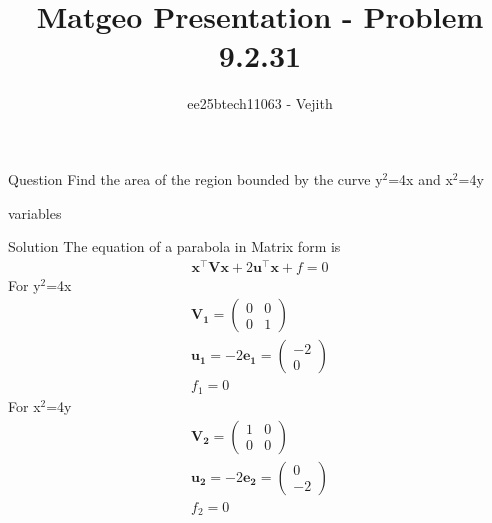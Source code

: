 \documentclass{beamer}
\title{Matgeo Presentation - Problem 9.2.31}
\author{ee25btech11063 - Vejith}
\numberwithin{equation}{section}
\theoremstyle{remark}
\newcommand{\myvec}[1]{\ensuremath{\begin{pmatrix}#1\end{pmatrix}}}
\let\vec\mathbf
\begin{document}
\frame{\titlepage}
\begin{frame}{Question}
Find the area of the region bounded by the curve y$^2$=4x and x$^2$=4y
\end{frame}

\begin{frame}{variables}
 \begin{table}[h!]    
  \centering
  
  \caption{Variables Used}
  \label{}
\end{table}   
\end{frame}

\begin{frame}{Solution}
    The equation of a parabola in Matrix form is
\begin{align}
\vec{x}^\top\vec{V}\vec{x} + 2\vec{u}^\top\vec{x} + f = 0
\end{align}
For y$^2$=4x
\begin{align}
    \vec{V_1}=\begin{pmatrix}
        0 & 0\\
        0 & 1
    \end{pmatrix}\\
    \vec{u_1}=-2\vec{e_1}=\myvec{-2\\0}\\
    f_1=0
\end{align}
For x$^2$=4y
\begin{align}
    \vec{V_2}=\begin{pmatrix}
        1 & 0\\
        0 & 0
    \end{pmatrix}\\
    \vec{u_2}=-2\vec{e_2}=\myvec{0\\-2}\\
    f_2=0
\end{align}
\end{frame}
\end{document}
